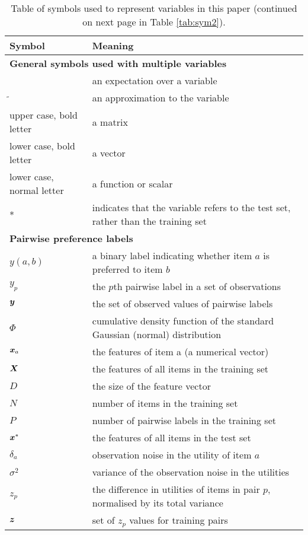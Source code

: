 \begin{table}[h!]
 \begin{tabularx}{\columnwidth}{p{1.7cm} X }
 \toprule 
 Symbol & Meaning \\
 \midrule 
 \multicolumn{2}{l}{\textbf{General symbols used with multiple variables}} \\
 $\hat{}$ & an expectation over a variable \\
 $\tilde{}$ & an approximation to the variable \\
 upper case, bold letter & a matrix \\
 lower case, bold letter & a vector \\
 lower case, normal letter & a function or scalar \\
 * & indicates that the variable refers to the test set, rather than the training set \\
  \multicolumn{2}{l}{\textbf{Pairwise preference labels}} \\
 $y(a,b)$ & a binary label indicating whether item $a$ is preferred to item $b$ \\
 $y_p$ & the $p$th pairwise label in a set of observations \\
 $\boldsymbol y$ & the set of observed values of pairwise labels \\
 $\Phi$ & cumulative density function of the standard Gaussian (normal) distribution \\
 $\boldsymbol x_a$ & the features of item a (a numerical vector) \\
 $\boldsymbol X$ & the features of all items in the training set \\
 $D$ & the size of the feature vector \\
 $N$ & number of items in the training set \\
 $P$ & number of pairwise labels in the training set \\
 $\boldsymbol x^*$ & the features of all items in the test set \\
 $\delta_a$ & observation noise in the utility of item $a$ \\
 $\sigma^2$ & variance of the observation noise in the utilities \\
 $z_p$ & the difference in utilities of items in pair $p$, normalised by its total variance \\
 $\boldsymbol z$ & set of $z_p$ values for training pairs \\ 
  \bottomrule
 \end{tabularx}
 \caption{Table of symbols used to represent variables in this paper (continued on next page
 in Table \ref{tab:sym2}).}
 \label{tab:sym1}
\end{table}
